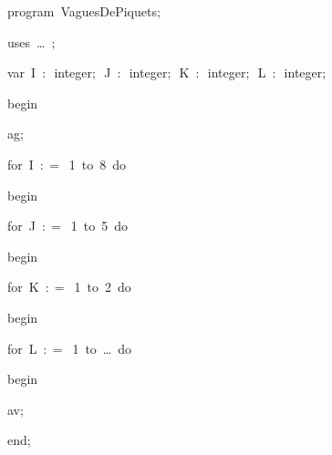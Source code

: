 
{
\parindent {}
\medskip

\carrenoir
\vspace{\neglskip}\mbox{\blc  \idt  \mcl program\idt \ VaguesDePiquets$;$
}\par 
\vspace{\neglskip}\mbox{\blc \blk\idt \mcl uses\idt \ \ldots\ $;$
}\par 
\pagebreak[3] 
\vspace{\neglskip}\mbox{\blc  \blk\idt  \mcl var\idt \ I\ $:$\ integer$;$\ J\ $:$\ integer$;$\ K\ $:$\ integer$;$\ L\ $:$\ integer$;$}\par 
\vspace{\neglskip}\mbox{\blc  \idt  \mcl begin\idt }\par 
\vspace{\neglskip}\mbox{\blc  \blk\idt  ag$;$}\par 
\pagebreak[3] 
\vspace{\neglskip}\mbox{\blc  \blk\idt  \mcl for\idt \ I\ $:$$=$\ 1\ \mcl to\idt \ 8\ \mcl do\idt }\par 
\vspace{\neglskip}\mbox{\blc  \blk\blk\idt  \mcl begin\idt }\par 
\pagebreak[3] 
\vspace{\neglskip}\mbox{\blc  \blk\blk\blk\idt  \mcl for\idt \ J\ $:$$=$\ 1\ \mcl to\idt \ 5\ \mcl do\idt }\par 
\vspace{\neglskip}\mbox{\blc  \blk\blk\blk\blk\idt  \mcl begin\idt }\par 
\pagebreak[3] 
\vspace{\neglskip}\mbox{\blc  \blk\blk\blk\blk\blk\idt  \mcl for\idt \ K\ $:$$=$\ 1\ \mcl to\idt \ 2\ \mcl do\idt }\par 
\vspace{\neglskip}\mbox{\blc  \blk\blk\blk\blk\blk\blk\idt  \mcl begin\idt }\par 
\pagebreak[3] 
\vspace{\neglskip}\mbox{\blc  \blk\blk\blk\blk\blk\blk\blk\idt  \mcl for\idt \ L\ $:$$=$\ 1\ \mcl to\idt \ \ldots\ \mcl do\idt }\par 
\vspace{\neglskip}\mbox{\blc  \blk\blk\blk\blk\blk\blk\blk\blk\idt  \mcl begin\idt }\par 
\vspace{\neglskip}\mbox{\blc  \blk\blk\blk\blk\blk\blk\blk\blk\blk\idt  av$;$}\par 
\vspace{\neglskip}\mbox{\blc  \blk\blk\blk\blk\blk\blk\blk\blk\idt  \mcl end\idt $;$}\par 
}
